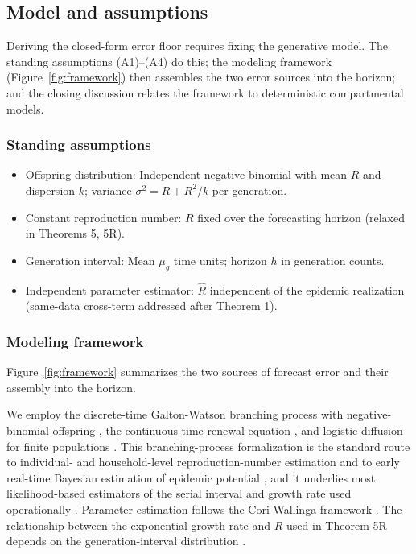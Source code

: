 \documentclass[review]{elsarticle}
\theoremstyle{plain}
\theoremstyle{definition}
\begin{document}
\subsection{Model and assumptions}

Deriving the closed-form error floor requires fixing the generative model. The standing assumptions (A1)--(A4) do this; the modeling framework (Figure~\ref{fig:framework}) then assembles the two error sources into the horizon; and the closing discussion relates the framework to deterministic compartmental models.

\subsubsection{Standing assumptions}

\begin{itemize}
\item[(A1)] Offspring distribution: Independent negative-binomial with mean $R$ and dispersion $k$; variance $\sigma^2 = R + R^2/k$ per generation.
\item[(A2)] Constant reproduction number: $R$ fixed over the forecasting horizon (relaxed in Theorems 5, 5R).
\item[(A3)] Generation interval: Mean $\mu_g$ time units; horizon $h$ in generation counts.
\item[(A4)] Independent parameter estimator: $\hat{R}$ independent of the epidemic realization (same-data cross-term addressed after Theorem 1).
\end{itemize}

\subsubsection{Modeling framework}

Figure~\ref{fig:framework} summarizes the two sources of forecast error and their assembly into the horizon.

We employ the discrete-time Galton-Watson branching process with negative-binomial offspring \citep{harris1963branching, jagers1975branching, lloyd-smith2005superspreading}, the continuous-time renewal equation \citep{wallinga2004different, cori2013framework}, and logistic diffusion for finite populations \citep{ethier1986markov, nassel2001extinction, kessler2007extinction, assaf2017extinction}. This branching-process formalization is the standard route to individual- and household-level reproduction-number estimation \citep{fraser2007estimating} and to early real-time Bayesian estimation of epidemic potential \citep{bettencourt2008real}, and it underlies most likelihood-based estimators of the serial interval and growth rate used operationally \citep{white2008likelihood}. Parameter estimation follows the Cori-Wallinga framework \citep{cori2013framework, gostic2020practical, abbott2020epinow2}. The relationship between the exponential growth rate and $R$ used in Theorem 5R depends on the generation-interval distribution \citep{wallinga2007generation}.
\end{document}
